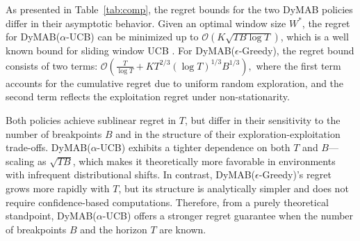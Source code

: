 \documentclass[review]{jair}
\begin{document}
As presented in Table~\ref{tab:comp}, the regret bounds for the two DyMAB policies differ in their asymptotic behavior. Given an optimal window size $W^*$, the regret for DyMAB($\alpha$-UCB) can be minimized up to  $\mathcal{O}( K \sqrt{T B \log T})$, which is a well known bound for sliding window UCB \citep{Non-Stationary, Non-Stationary3}. For DyMAB($\epsilon$-Greedy), the regret bound consists of two terms: $\mathcal{O} \left( \frac{T}{\log T} + K T^{2/3} (\log T)^{1/3} B^{1/3} \right),$
where the first term accounts for the cumulative regret due to uniform random exploration, and the second term reflects the exploitation regret under non-stationarity.

Both policies achieve sublinear regret in $T$, but differ in their sensitivity to the number of breakpoints $B$ and in the structure of their exploration-exploitation trade-offs. DyMAB($\alpha$-UCB) exhibits a tighter dependence on both $T$ and $B$—scaling as $\sqrt{T B}$, which makes it theoretically more favorable in environments with infrequent distributional shifts. In contrast, DyMAB($\epsilon$-Greedy)'s regret grows more rapidly with $T$, but its structure is analytically simpler and does not require confidence-based computations. Therefore, from a purely theoretical standpoint, DyMAB($\alpha$-UCB) offers a stronger regret guarantee when the number of breakpoints $B$ and the horizon $T$ are known.

\end{document}
